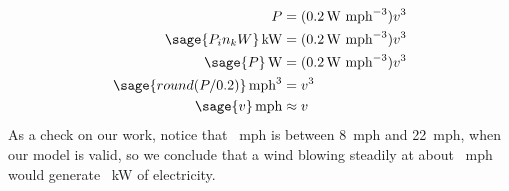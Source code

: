 \documentclass[12pt]{article}
\begin{document}
{\begin{align*}
P					&=(0.2\,\text{W mph}^{-3}) v^3 \\
\sage{P_in_kW}\,\text{kW}  	&=(0.2\,\text{W mph}^{-3}) v^3 \\
\sage{P}\,\text{W}  	&=(0.2\,\text{W mph}^{-3}) v^3 \\
\sage{round(P/0.2)}\,\text{mph}^3 	&=v^3 \\
\sage{v}\,\text{mph}	&\approx v
\end{align*}
As a check on our work, notice that ~mph is between 8~mph and 22~mph, when our model is valid, so we conclude that a wind blowing steadily at about ~mph would generate ~kW of electricity.

\vfill
\eject
\newpage
} %
\end{document}
